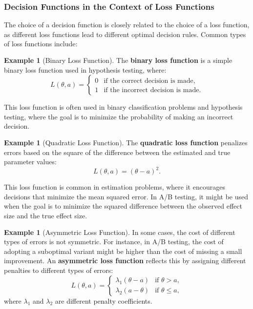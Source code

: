 \documentclass[magisterska, english]{pwr_wmat_praca_dyplomowa}
\theoremstyle{plain}
\numberwithin{theorem}{chapter}
\theoremstyle{definition}
\numberwithin{theorem}{chapter}
\newtheorem{example}[theorem]{Example}
\begin{document}
\subsubsection{Decision Functions in the Context of Loss Functions}

The choice of a decision function is closely related to the choice of a loss function, as different loss functions lead to different optimal decision rules. Common types of loss functions include:

\begin{example}[Binary Loss Function]
	The \textbf{binary loss function} is a simple binary loss function used in hypothesis testing, where:
	\[
	L(\theta, a) = 
	\begin{cases} 
		0 & \text{if the correct decision is made}, \\
		1 & \text{if the incorrect decision is made}.
	\end{cases}
	\]
\end{example}

This loss function is often used in binary classification problems and hypothesis testing, where the goal is to minimize the probability of making an incorrect decision.

\begin{example}[Quadratic Loss Function]
The \textbf{quadratic loss function} penalizes errors based on the square of the difference between the estimated and true parameter values:
\[
L(\theta, a) = (\theta - a)^2.
\]
\end{example}

This loss function is common in estimation problems, where it encourages decisions that minimize the mean squared error. In A/B testing, it might be used when the goal is to minimize the squared difference between the observed effect size and the true effect size.

\begin{example}[Asymmetric Loss Function]
	In some cases, the cost of different types of errors is not symmetric. For instance, in A/B testing, the cost of adopting a suboptimal variant might be higher than the cost of missing a small improvement. An \textbf{asymmetric loss function} reflects this by assigning different penalties to different types of errors:
	\[
	L(\theta, a) = 
	\begin{cases} 
		\lambda_1(\theta - a) & \text{if } \theta > a, \\
		\lambda_2(a - \theta) & \text{if } \theta \leq a,
	\end{cases}
	\]
	where \( \lambda_1 \) and \( \lambda_2 \) are different penalty coefficients.
\end{example}
\end{document}
